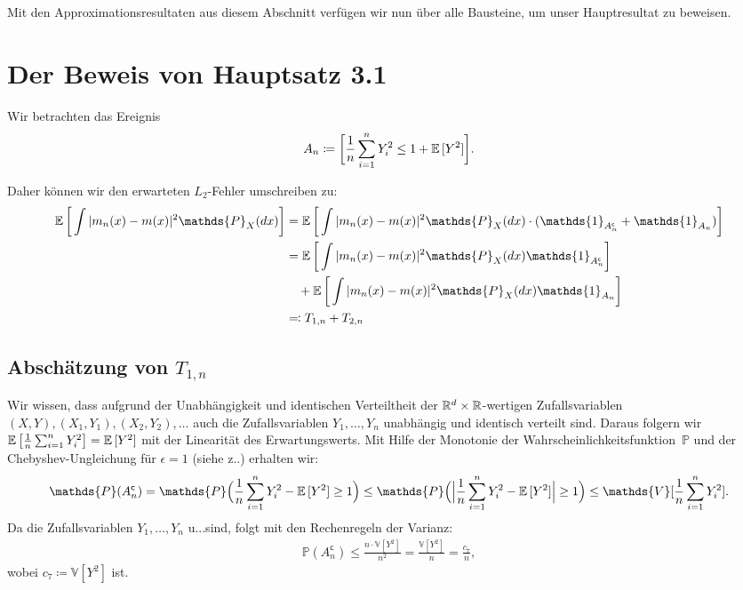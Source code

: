 {Mit den Approximationsresultaten aus diesem Abschnitt verfügen wir nun über alle Bausteine, um unser Hauptresultat zu beweisen.

\section{Der Beweis von Hauptsatz 3.1}

Wir betrachten das Ereignis 
\begin{equation}
\label{event}
A_n \coloneqq \bigg[\frac{1}{n} \sum_{i = 1}^n Y_i^2 \leq 1 + \mathbb{E}\,[Y^2]\bigg].
\end{equation}

Daher können wir den erwarteten $L_2$-Fehler umschreiben zu:
\begin{equation}
\label{originaleq}
\begin{split}
\E \bigg[\int |m_n(x) - m(x)|^2 \mathds{P}_X(dx)\bigg] & = \E \bigg[\int |m_n(x) - m(x)|^2 \mathds{P}_X(dx) \cdot (\mathds{1}_{A_n^{\mathsf{c}}} + \mathds{1}_{A_n})\bigg] \\
& = \E \bigg[\int |m_n(x) - m(x)|^2 \mathds{P}_X(dx) \mathds{1}_{A_n^{\mathsf{c}}}\bigg] \\
& \quad + \E \bigg[\int |m_n(x) - m(x)|^2 \mathds{P}_X(dx) \mathds{1}_{A_n}\bigg] \\
& \eqqcolon T_{1,n} + T_{2,n}
\end{split}
\end{equation}

\subsection{Abschätzung von $T_{1,n}$}

Wir wissen, dass aufgrund der Unabhängigkeit und identischen Verteiltheit der $\mathbb{R}^d \times \mathbb{R}$-wertigen Zufallsvariablen  $(X, Y), (X_1, Y_1), (X_2, Y_2), \dots$ auch die Zufallsvariablen $Y_1,\dots,Y_n$ unabhängig und identisch verteilt sind. 
Daraus folgern wir $\mathbb{E}\,\big[\frac{1}{n} \sum_{i = 1}^n Y_i^2\big] = \mathbb{E}\,[Y^2]$ mit der Linearität des Erwartungswerts.
Mit Hilfe der Monotonie der Wahrscheinlichkeitsfunktion~$\mathds{P}$ und der Chebyshev-Ungleichung für $\epsilon = 1$ (siehe z.\@B.\@ \cite[Satz 5.11]{Klenke2013}) erhalten wir:
\begin{equation*}
\begin{split}
\mathds{P}(A_n^{\mathsf{c}}) = \mathds{P}\Big(\frac{1}{n}\sum_{i=1}^n Y_i^2 - \E[Y^2] \geq 1\Big)
\leq \mathds{P}\Big(\Big|\frac{1}{n}\sum_{i=1}^n Y_i^2 - \E[Y^2]\Big| \geq 1\Big)
\leq \mathds{V}[\frac{1}{n}\sum_{i = 1}^nY_i^2].
\end{split}
\end{equation*}
Da die Zufallsvariablen $Y_1,\dots,Y_n$ u.\@i.\@v.\@ sind, folgt mit den Rechenregeln der Varianz:
\begin{equation}
\label{tscheby}
\begin{split}
\mathds{P}(A_n^{\mathsf{c}}) \leq \frac{n \cdot  \mathds{V}[Y^2]}{n^2}
= \frac{\mathds{V}[Y^2]}{n}
= \frac{c_7}{n},
\end{split}
\end{equation}
wobei $c_7 \coloneqq \mathds{V}[Y^2]$ ist. 

}
